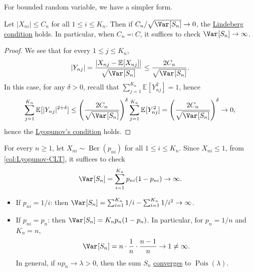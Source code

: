 For bounded random variable, we have a simpler form.

\begin{corollary}\label{col:Lyopunov-CLT}
	Let \(\vert X_{ni} \vert \leq C_n\) for all \(1 \leq i \leq K_n\). Then if \(C_n / \sqrt{\Var_{}[S_n] } \to 0\), the \hyperref[def:Lindeberg-condition]{Lindeberg condition} holds. In particular, when \(C_n \eqqcolon C\), it suffices to check \(\Var_{}[S_n] \to \infty \).
\end{corollary}
\begin{proof}
	We see that for every \(1 \leq j \leq K_n\),
	\[
		\vert Y_{nj} \vert
		= \frac{\vert X_{nj} - \mathbb{E}_{}[X_{nj}] \vert }{\sqrt{\Var_{}[S_n] } }
		\leq \frac{2 C_n}{\sqrt{\Var_{}[S_n] } }.
	\]
	In this case, for any \(\delta > 0\), recall that \(\sum_{j=1}^{K_n} \mathbb{E}_{}[Y_{nj}^2] = 1\), hence
	\[
		\sum_{j=1}^{K_n} \mathbb{E}_{}[\vert Y_{nj} \vert ^{2 + \delta }]
		\leq \left( \frac{2C_n}{\sqrt{\Var_{}[S_n] } } \right) ^\delta \sum_{j=1}^{K_n} \mathbb{E}_{}[Y_{nj}^2]
		= \left( \frac{2C_n}{\sqrt{\Var_{}[S_n] } } \right) ^\delta
		\to 0,
	\]
	hence the \hyperref[thm:Lyopunov-CLT]{Lyopunov's condition} holds.
\end{proof}

\begin{eg}\label{eg:Lyopunov-CLT}
	For every \(n \geq 1\), let \(X_{ni} \sim \operatorname{Ber}(p_{ni}) \) for all \(1 \leq i \leq K_n\). Since \(X_{ni} \leq 1\), from \autoref{col:Lyopunov-CLT}, it suffices to check
	\[
		\Var_{}[S_n]
		= \sum_{i=1}^{K_n} p_{ni} (1 - p_{ni}) \to \infty .
	\]
	\begin{itemize}
		\item If \(p_{ni} = 1 / i\): then \(\Var_{}[S_n] = \sum_{i=1}^{K_n} 1 / i - \sum_{i=1}^{K_n} 1 / i^2 \to \infty \).
		\item If \(p_{ni} = p_n\): then \(\Var_{}[S_n] = K_n p_n (1 - p_n)\). In particular, for \(p_n = 1 / n\) and \(K_n = n\),
		      \[
			      \Var_{}[S_n]
			      = n \cdot \frac{1}{n} \cdot \frac{n-1}{n}
			      \to 1
			      \neq \infty .
		      \]
		      In general, if \(n p_n \to \lambda > 0\), then the sum \(S_n\) \hyperref[def:converge-in-distribution]{converges} to \(\operatorname{Pois}(\lambda ) \).
	\end{itemize}
\end{eg}

\section{}
